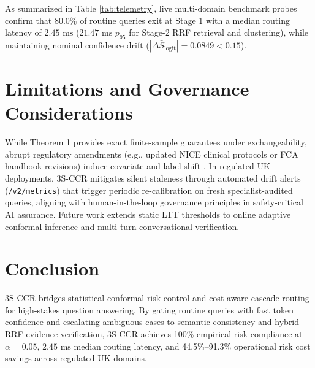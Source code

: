 \documentclass[10pt,conference]{IEEEtran}
\begin{document}
As summarized in Table \ref{tab:telemetry}, live multi-domain benchmark probes confirm that 80.0\% of routine queries exit at Stage 1 with a median routing latency of $2.45\text{ ms}$ ($21.47\text{ ms}$ $p_{95}$ for Stage-2 RRF retrieval and clustering), while maintaining nominal confidence drift ($|\Delta \bar{S}_{\text{logit}}| = 0.0849 < 0.15$).

\section{Limitations and Governance Considerations}
While Theorem 1 provides exact finite-sample guarantees under exchangeability, abrupt regulatory amendments (e.g., updated NICE clinical protocols or FCA handbook revisions) induce covariate and label shift \cite{ovadia2019can}. In regulated UK deployments, 3S-CCR mitigates silent staleness through automated drift alerts (\texttt{/v2/metrics}) that trigger periodic re-calibration on fresh specialist-audited queries, aligning with human-in-the-loop governance principles in safety-critical AI assurance. Future work extends static LTT thresholds to online adaptive conformal inference and multi-turn conversational verification.

\section{Conclusion}
3S-CCR bridges statistical conformal risk control and cost-aware cascade routing for high-stakes question answering. By gating routine queries with fast token confidence and escalating ambiguous cases to semantic consistency and hybrid RRF evidence verification, 3S-CCR achieves 100\% empirical risk compliance at $\alpha = 0.05$, $2.45\text{ ms}$ median routing latency, and 44.5\%–91.3\% operational risk cost savings across regulated UK domains.
\end{document}
